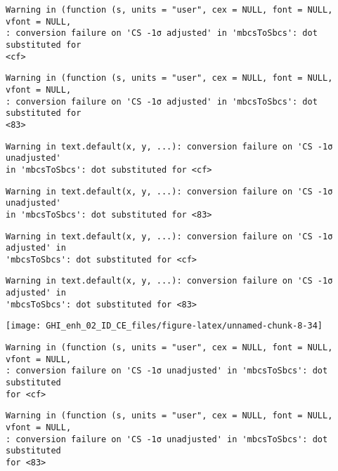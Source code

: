 \documentclass[
  10pt,
  a4paper,oneside]{article}
\begin{document}
\begin{verbatim}
Warning in (function (s, units = "user", cex = NULL, font = NULL, vfont = NULL,
: conversion failure on 'CS -1σ adjusted' in 'mbcsToSbcs': dot substituted for
<cf>
\end{verbatim}

\begin{verbatim}
Warning in (function (s, units = "user", cex = NULL, font = NULL, vfont = NULL,
: conversion failure on 'CS -1σ adjusted' in 'mbcsToSbcs': dot substituted for
<83>
\end{verbatim}

\begin{verbatim}
Warning in text.default(x, y, ...): conversion failure on 'CS -1σ unadjusted'
in 'mbcsToSbcs': dot substituted for <cf>
\end{verbatim}

\begin{verbatim}
Warning in text.default(x, y, ...): conversion failure on 'CS -1σ unadjusted'
in 'mbcsToSbcs': dot substituted for <83>
\end{verbatim}

\begin{verbatim}
Warning in text.default(x, y, ...): conversion failure on 'CS -1σ adjusted' in
'mbcsToSbcs': dot substituted for <cf>
\end{verbatim}

\begin{verbatim}
Warning in text.default(x, y, ...): conversion failure on 'CS -1σ adjusted' in
'mbcsToSbcs': dot substituted for <83>
\end{verbatim}

\begin{center}\texttt{[image: GHI\_enh\_02\_ID\_CE\_files/figure-latex/unnamed-chunk-8-34]} \end{center}

\begin{verbatim}
Warning in (function (s, units = "user", cex = NULL, font = NULL, vfont = NULL,
: conversion failure on 'CS -1σ unadjusted' in 'mbcsToSbcs': dot substituted
for <cf>
\end{verbatim}

\begin{verbatim}
Warning in (function (s, units = "user", cex = NULL, font = NULL, vfont = NULL,
: conversion failure on 'CS -1σ unadjusted' in 'mbcsToSbcs': dot substituted
for <83>
\end{verbatim}
\end{document}
